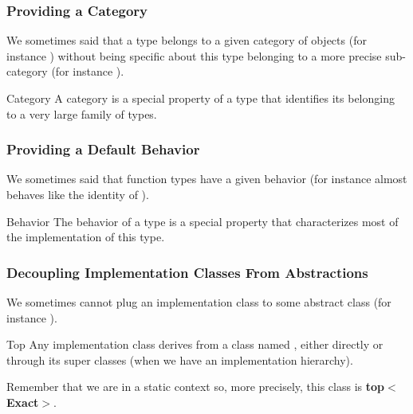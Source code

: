 \begin{frame}
  \frametitle{Providing a Category}

  We sometimes said that a type belongs to a given category of objects
  (for instance \bfIterator) without being specific about this type
  belonging to a more precise sub-category (for instance
  \bfForwardIterator).

  \bigskip

  \begin{block}{Category}
    A category is a special property of a type that identifies its
    belonging to a very large family of types.
  \end{block}

\end{frame}



\begin{frame}
  \frametitle{Providing a Default Behavior}

  We sometimes said that function types have a given behavior (for
  instance \bfhelloiteratorI almost behaves like the identity of
  \bfI).

  \bigskip

\begin{block}{Behavior}
  The behavior of a type is a special property that characterizes most
  of the implementation of this type.
\end{block}

\end{frame}




\begin{frame}
  \frametitle{Decoupling Implementation Classes From Abstractions}

  We sometimes cannot plug an implementation class to some abstract
  class (for instance \bfreverseI).

  \bigskip

\begin{block}{Top}
  Any implementation class derives from a class named \bftop,
  either directly or through its super classes (when we have an
  implementation hierarchy).
\end{block}

  \bigskip

  Remember that we are in a static context so, more precisely, this
  class is \textbf{top$<$Exact$>$}.

\end{frame}




